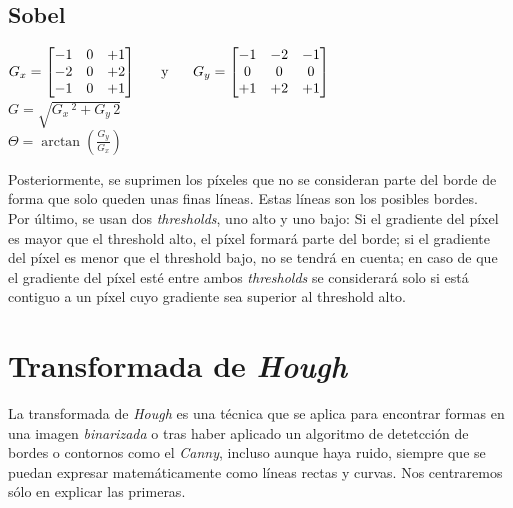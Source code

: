 \subsection{Sobel}
\begin{center}
  $ G_x = \begin{bmatrix}
    -1 & 0 & +1 \\
    -2 & 0 & +2 \\
    -1 & 0 & +1 \\
  \end{bmatrix}
  \hspace{0.5cm} \text{ y } \hspace{0.5cm} G_y = \begin{bmatrix}
    -1 & -2 & -1 \\
    0 & 0 & 0 \\
    +1 & +2 & +1 \\
  \end{bmatrix}
  $
  \\[0.5cm]
  $G = \sqrt{G_x\,^2 + G_y\,{2}}$
  \\[0.5cm]
  $\Theta= \arctan\left(\frac{G_y}{G_x} \right)$
\end{center}
Posteriormente, se suprimen los píxeles que no se consideran parte del
borde de forma que solo queden unas finas líneas. Estas líneas son los posibles bordes.\\
Por último, se usan dos \emph{thresholds}, uno alto y uno bajo: Si el
gradiente del píxel es mayor que el threshold alto, el píxel formará
parte del borde; si el gradiente del píxel es menor que el threshold
bajo, no se tendrá en cuenta; en caso de que el gradiente del píxel
esté entre ambos \emph{thresholds} se considerará solo si está
contiguo a un píxel cuyo gradiente sea superior al threshold alto.

\section{Transformada de \emph{Hough}}
La transformada de \emph{Hough} es una técnica que se aplica para
encontrar formas en una imagen \emph{binarizada} o tras haber aplicado
un algoritmo de detetcción de bordes o contornos como el \emph{Canny},
incluso aunque haya ruido, siempre que se puedan expresar
matemáticamente como líneas rectas y curvas. Nos centraremos sólo en
explicar las primeras.
